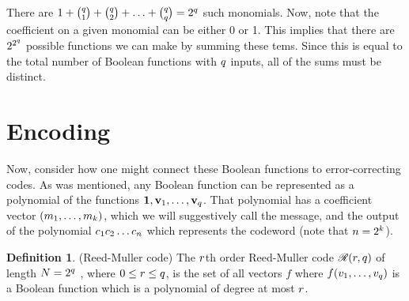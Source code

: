 \documentclass[12pt,twoside]{reedthesis}
\theoremstyle{definition}
\newtheorem{definition}[theorem]{Definition}
\begin{document}
There are $1 + { q \choose 1} + { q \choose 2}+ \ldots + {q \choose q} = 2^q$ such monomials. Now, note that the coefficient on a given monomial can be either 0 or 1. This implies that there are $2^{2^q}$ possible functions we can make by summing these tems. Since this is equal to the total number of Boolean functions with $q$ inputs, all of the sums must be distinct.
\section{Encoding}
Now, consider how one might connect these Boolean functions to error-correcting codes. As was mentioned, any Boolean function can be represented as a polynomial of the functions $\mathbf{1}, \mathbf{v}_{1}, \ldots, \mathbf{v}_{q}$. That polynomial has a coefficient vector $(m_{1}, \ldots, m_{k})$, which we will suggestively call the message, and the output of the polynomial $c_{1}c_{2} \ldots c_{n}$ which represents the codeword (note that $n = 2^k$). 


\begin{definition} (Reed-Muller code) The $r$th order Reed-Muller code $\mathscr{R}(r, q)$ of length $N = 2^q$ , where $0 \leq r \leq q$, is the set of all vectors $f$ where $f(v_{1}, \ldots, v_{q})$ is a Boolean function which is a polynomial of degree at most $r$.
\end{definition}
\end{document}
